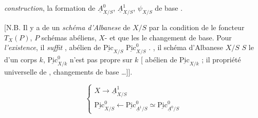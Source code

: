 \documentclass[11pt,a4paper]{article}
\begin{document}
  \ill{} \ill{}    \emph{construction}, \struck{\ill{}} la formation de $\underline{A}^{0}_{X/S}$, $\underline{A}^{1}_{X/S}$, $\psi_{X/S}$    de base .

[N.B. Il y a   de   un \emph{schéma d'Albanese} de $X/S$ par la condition de  le foncteur $T_X(P)$, $P$   schémas abéliens,   $X$-\ill{} et \ill{}  que les \ill{}     le changement de base. Pour \emph{l'existence}, il \emph{suffit} \ill{} \ill{}  \ill{},     \ill{}   abélien de $\underline{\mathrm{Pic}}_{X/S}$  $\underline{\mathrm{Pic}}^{0}_{X/S}$ \ill{} \ill{} \ill{}. , il \ill{}   schéma d'Albanese   $X/S$  \ill{} $S$  le  d'un corps $k$, \ill{} \ill{} $\underline{\mathrm{Pic}}^{0}_{X/k}$ n'est pas propre sur $k$ \add{\ill{}} [   abélien de $\underline{\mathrm{Pic}}_{X/k}$ ; il     propriété universelle de  ,   changements de base …]].

\[
\begin{cases}
X \longrightarrow \underline{A}^{1}_{X/S} \\[4pt]
\underline{\mathrm{Pic}}^{0}_{X/S} \longleftarrow \underline{\mathrm{Pic}}^{0}_{\underline{A}^{1}/S} \simeq \underline{\mathrm{Pic}}^{0}_{\underline{A}^{0}/S}
\end{cases}
\]
\end{document}
